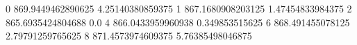 0 869.9449462890625 4.25140380859375
1 867.1680908203125 1.47454833984375
2 865.6935424804688 0.0
4 866.0433959960938 0.349853515625
6 868.491455078125 2.79791259765625
8 871.4573974609375 5.76385498046875
